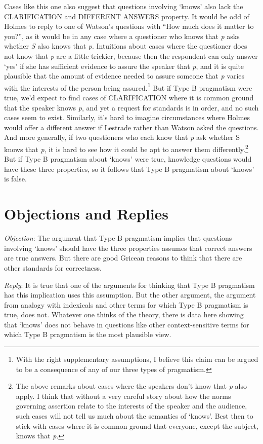 Cases like this one also suggest that questions involving `knows' also lack the CLARIFICATION and DIFFERENT ANSWERS property. It would be odd of Holmes to reply to one of Watson's questions with ``How much does it matter to you?'', as it would be in any case where a questioner who knows that \textit{p} asks whether \textit{S} also knows that \textit{p}. Intuitions about cases where the questioner does not know that \textit{p} are a little trickier, because then the respondent can only answer `yes' if she has sufficient evidence to assure the speaker that \textit{p}, and it is quite plausible that the amount of evidence needed to assure someone that \textit{p} varies with the interests of the person being assured.\footnote{With the right supplementary assumptions, I believe this claim can be argued to be a consequence of any of our three types of pragmatism.} But if Type B pragmatism were true, we'd expect to find cases of CLARIFICATION where it is common ground that the speaker knows \textit{p}, and yet a request for standards is in order, and no such cases seem to exist. Similarly, it's hard to imagine circumstances where Holmes would offer a different answer if Lestrade rather than Watson asked the questions. And more generally, if two questioners who each know that \textit{p} ask whether S knows that \textit{p}, it is hard to see how it could be apt to answer them differently.\footnote{The above remarks about cases where the speakers don't know that \textit{p} also apply. I think that without a very careful story about how the norms governing assertion relate to the interests of the speaker and the audience, such cases will not tell us much about the semantics of `knows'. Best then to stick with cases where it is common ground that everyone, except the subject, knows that \textit{p}.} But if Type B pragmatism about `knows' were true, knowledge questions would have these three properties, so it follows that Type B pragmatism about `knows' is false.

\section{Objections and Replies}

\noindent \textit{Objection}: The argument that Type B pragmatism implies that questions involving `knows' should have the three properties assumes that correct answers are true answers. But there are good Gricean reasons to think that there are other standards for correctness.

\medskip \noindent \textit{Reply}: It is true that one of the arguments for thinking that Type B pragmatism has this implication uses this assumption. But the other argument, the argument from analogy with indexicals and other terms for which Type B pragmatism is true, does not. Whatever one thinks of the theory, there is data here showing that `knows' does not behave in questions like other context-sensitive terms for which Type B pragmatism is the most plausible view.

